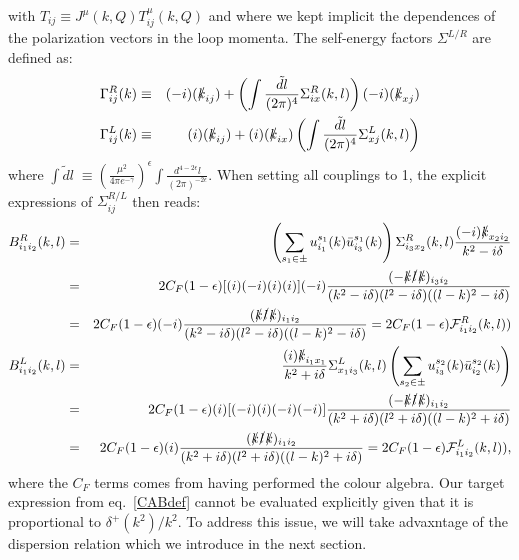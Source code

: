 \documentclass[11pt]{article}
\begin{document}
with $T_{ij}\equiv J^\mu(k,Q) T^\mu_{ij}(k,Q)$ and where we kept implicit the dependences of the polarization vectors in the loop momenta.
The self-energy factors $\Sigma^{L/R}$ are defined as:
\begin{eqnarray}
\Gamma^{R}_{ij} (k) &\equiv& (-i) (\slashed{k}_{i j} ) + \left( \int \frac{\tilde{d}l}{(2\pi)^4} \Sigma^{R}_{ix} (k,l) \right)  (-i) (\slashed{k}_{x j} ) \nonumber\\
\Gamma^{L}_{ij} (k) &\equiv& (i) (\slashed{k}_{i j} ) + (i) (\slashed{k}_{i x} ) \left(\int \frac{\tilde{d}l}{(2\pi)^4} \Sigma^{L}_{x j}(k,l) \right)
\end{eqnarray}
where  $\int \tilde{d}l\; \equiv \left(\frac{\mu^2}{4\pi e^{-\gamma}}\right)^{\epsilon} \int \frac{d^{4-2\epsilon}l}{(2\pi)^{-2\epsilon}} $. When setting all couplings to 1, the explicit expressions of $\Sigma^{R/L}_{ij}$ then reads:
\begin{eqnarray}
\label{Fdefinitions}
B^R_{i_1 i_2}(k,l)&=& \left( \sum_{s_1 \in \pm} u^{s_1}_{i_1}(k) \bar{u}^{s_1}_{i_3}(k) \right) \Sigma^{R}_{i_3 x_2}(k,l)\frac{ (-i)\slashed{k}_{x_2 i_2}}{k^2-i\delta} \nonumber\\ 
&=& 2 C_F (1-\epsilon) [(i)(-i)(i)(i)](-i) \frac{ (-\slashed{k}\slashed{l}\slashed{k})_{i_3 i_2} }{(k^2-i\delta)(l^2-i\delta) ((l-k)^2-i\delta)} \nonumber\\
&=& 2 C_F (1-\epsilon) (-i) \frac{ (\slashed{k}\slashed{l}\slashed{k})_{i_1 i_2} }{(k^2-i\delta) (l^2-i\delta) ((l-k)^2-i\delta)} 
= 2 C_F (1-\epsilon) \mathcal{F}^R_{i_1i_2}(k,l))
\nonumber\\
B^L_{i_1 i_2}(k,l)&=& \frac{(i)\slashed{k}_{i_1 x_1}}{k^2+i\delta} \Sigma^{L}_{x_1 i_3}(k,l) \left( \sum_{s_2 \in \pm} u^{s_2}_{i_3}(k)\bar{u}^{s_2}_{i_2}(k)  \right) \nonumber\\
&=& 2 C_F (1-\epsilon) (i)[(-i)(i)(-i)(-i)] \frac{ (-\slashed{k}\slashed{l}\slashed{k})_{i_1 i_2} }{ (k^2+i\delta) (l^2+i\delta) ((l-k)^2+i\delta)}\nonumber\\
&=& 2 C_F (1-\epsilon) (i) \frac{ (\slashed{k}\slashed{l}\slashed{k})_{i_1 i_2} }{(k^2+i\delta) (l^2+i\delta) ((l-k)^2+i\delta)} 
= 2 C_F (1-\epsilon)  \mathcal{F}^L_{i_1i_2}(k,l)),
\nonumber \\  
\end{eqnarray}
where the $C_F$ terms comes from having performed the colour algebra.
Our target expression from eq.~\ref{CABdef} cannot be evaluated explicitly given that it is proportional to $\delta^{+}\left(k^2\right)/k^2$.
To address this issue, we will take advaxntage of the dispersion relation which we introduce in the next section.
\end{document}
